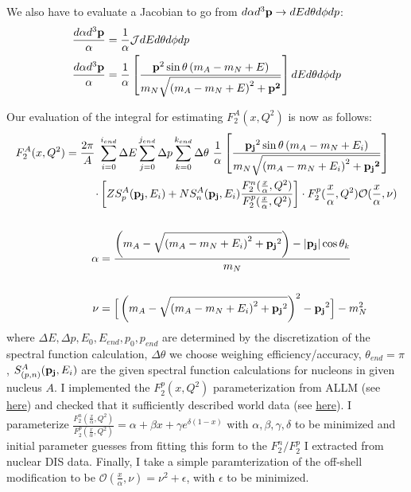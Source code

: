 \documentclass{article}
\begin{document}
We also have to evaluate a Jacobian to go from $d\alpha d^3 {\bf{p}} \rightarrow dE d\theta d\phi dp$:
\begin{eqnarray}
	\centering
	\begin{split}	
		\frac{d\alpha d^3 {\bf{p}}}{\alpha} &= \frac{1}{\alpha} \mathcal{J} dE d\theta d\phi dp					\\
		\frac{d\alpha d^3 {\bf{p}}}{\alpha} &= \frac{1}{\alpha}  \left[ \frac{{\bf{p}}^2 \sin{\theta} \left( m_A - m_N + E\right) }{ m_N \sqrt{ \left( m_A - m_N + E \right)^2 + {\bf{p}^2} }  } \right]dE d\theta d\phi dp
	\end{split}
\end{eqnarray}

Our evaluation of the integral for estimating $F_2^A(x,Q^2)$ is now as follows:
\begin{eqnarray}
	\centering
	\begin{split}
		F_2^A(x,Q^2)  = \frac{2\pi}{A} \ & \sum_{i=0}^{i_{end}}  \Delta E  \sum_{j=0}^{j_{end}}  \Delta p  \sum_{k=0}^{k_{end}} \Delta \theta \  
				\frac{1}{\alpha}  \left[ \frac{{\bf{p_j}}^2 \sin{\theta} \left( m_A - m_N + E_i\right) }{ m_N \sqrt{ \left( m_A - m_N + E_i \right)^2 + {\bf{p_j}^2} }  } \right] 	\\
				\cdot & \left[ Z S_p^A({\bf{p_j}},E_i)   + N S_n^A({\bf{p_j}},E_i) \frac{F_2^n(\frac{x}{\alpha},Q^2)}{F_2^p(\frac{x}{\alpha},Q^2)}  \right] \cdot F_2^p(\frac{x}{\alpha},Q^2) \mathcal{O}
			(\frac{x}{\alpha},\nu)			\\ \\
		\alpha &= 	\frac{ \left( m_A - \sqrt{\left(m_A-m_N+E_i\right)^{2} + {\bf{p_j}}^2} \right) - |{\bf{p_j}}|\cos{\theta_k} }{ m_N } \\ \\
		\nu &= \Big[\left(m_A - \sqrt{\left(m_A-m_N+E_i\right)^2 + {\bf{p_j}}^2} \right)^2 - {\bf{p_j}}^2\Big] - m_N^2
	\end{split}
\end{eqnarray}
where $\Delta E, \Delta p , E_{0}, E_{end}, p_{0}, p_{end}$ are determined by the discretization of the spectral function calculation, $\Delta \theta$ we choose 
weighing efficiency/accuracy, $\theta_{end}=\pi$, $S_{(p,n)}^A({\bf{p_j}},E_i)$ are the given spectral function calculations for nucleons in given nucleus $A$. I implemented
the $F_2^p(x,Q^2)$ parameterization from ALLM (see \href{https://arxiv.org/abs/hep-ph/9712415v2}{here}) and checked that it sufficiently described world data (see 
\href{https://arxiv.org/abs/1103.5704v2}{here}). I parameterize $\frac{F_2^n(\frac{x}{\alpha},Q^2)}{F_2^p(\frac{x}{\alpha},Q^2)} = \alpha + \beta x + \gamma e^{\delta(1-x)}$ 
with $\alpha,\beta,\gamma,\delta$ to be minimized and initial parameter guesses from fitting this form to the $F_2^n/F_2^p$ I extracted from nuclear DIS data. Finally, I take a
simple paramterization of the off-shell modification to be $\mathcal{O} (\frac{x}{\alpha},\nu) = \nu^2 + \epsilon$, with $\epsilon$ to be minimized.
\end{document}
